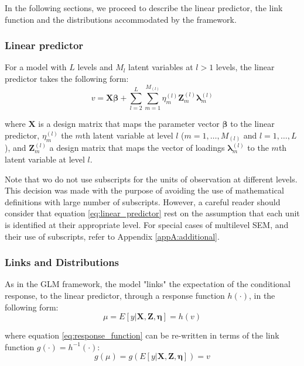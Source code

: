 In the following sections, we proceed to describe the linear predictor, the link function and the distributions accommodated by the framework.


\subsubsection{Linear predictor}
For a model with $L$ levels and $M_{l}$ latent variables at $l>1$ levels, the linear predictor takes the following form:
\begin{equation} \label{eq:linear_predictor}
	v = \mathbf{X} \pmb{\beta} + \sum_{l=2}^{L} \sum_{m=1}^{M_{(l)}} \eta_{m}^{(l)} \mathbf{Z}_{m}^{(l)} \pmb{\lambda}_{m}^{(l)}
\end{equation}

\noindent where $\mathbf{X}$ is a design matrix that maps the parameter vector $\pmb{\beta}$ to the linear predictor, $\eta_{m}^{(l)}$ the $m$th latent variable at level $l$ ($m=1, \dots, M_{(l)}$ and $l=1, \dots, L$), and $\mathbf{Z}_{m}^{(l)}$ a design matrix that maps the vector of loadings $\pmb{\lambda}_{m}^{(l)}$ to the $m$th latent variable at level $l$.

Note that wo do not use subscripts for the units of observation at different levels. This decision was made with the purpose of avoiding the use of mathematical definitions with large number of subscripts. However, a careful reader should consider that equation \ref{eq:linear_predictor} rest on the assumption that each unit is identified at their appropriate level. For special cases of multilevel SEM, and their use of subscripts, refer to Appendix \ref{appA:additional}.

\subsubsection{Links and Distributions}
As in the GLM framework, the model "links" the expectation of the conditional response, to the linear predictor, through a response function $h(\cdot)$, in the following form: 
\begin{equation} \label{eq:response_function}
	\mu = E[y | \mathbf{X}, \mathbf{Z}, \pmb{\eta}] = h(v)
\end{equation}

\noindent where equation \ref{eq:response_function} can be re-written in terms of the link function $g(\cdot) = h^{-1}(\cdot)$:
\begin{equation} \label{eq:link_function}
	g(\mu) = g(E[y | \mathbf{X}, \mathbf{Z}, \pmb{\eta}]) = v
\end{equation}

